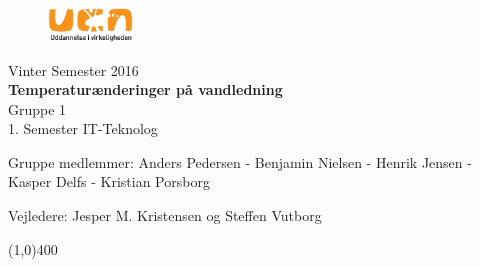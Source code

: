 \clearpage
\thispagestyle{empty}

\begin{figure}[H]
	\raggedleft
		\includegraphics[width=0.2\textwidth]{figures/logo-ucn.png}
\end{figure}
\vspace*{\fill} 
\begin{center}
\begin{Huge}
Vinter Semester 2016\\
\vspace{5 mm}
\textbf{Temperaturænderinger på vandledning}\\
\vspace{3 mm}
Gruppe 1\\
\vspace{3 mm}
1. Semester IT-Teknolog
\end{Huge}
\end{center}
\vspace*{\fill}
\begin{center}
Gruppe medlemmer:
 Anders Pedersen - Benjamin Nielsen - Henrik Jensen - Kasper Delfs - Kristian Porsborg
\end{center}
\begin{center}
Vejledere: Jesper M. Kristensen og Steffen Vutborg
\end{center}
\begin{center}
\line(1,0){400}
\end{center}